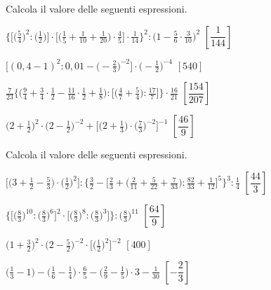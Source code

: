 \begin{esercizio}[\Ast]
\label{ese:3.150}
 Calcola il valore delle seguenti espressioni.
\begin{enumeratea}
\spazielenx
\item \(\displaystyle{\bigg\{\bigg[\bigg(\frac{5}{4}\bigg)^{2}:
\bigg(\frac{1}{2}\bigg)\bigg]\cdot%
\bigg[\bigg(\frac{1}{5}+\frac{1}{10}+\frac{1}{20}\bigg)\cdot\frac{4}{5}\bigg]
\cdot%
\frac{1}{14}\bigg\}^{2}:\bigg(1-\frac{5}{6}\cdot\frac{3}{10}\bigg)^{2}}\)
  \hfill \(\left[\dfrac{1}{144} \right]\)
\item \(\displaystyle{\bigg[(0,4-1)^{2}:0,01-\bigg(-{\frac{2}{3}}\bigg)^{-2}
\bigg]\cdot
\bigg(-{\frac{1}{2}}\bigg)^{-4}}\)
  \hfill \(\left[540 \right]\)
\item \(\displaystyle{\frac{7}{23}\bigg\{\bigg(\frac{9}{4}+\frac{3}{4}\cdot
{\frac{1}{2}}-\frac{11}{16}\cdot\frac{1}{2}+\frac{1}{8}\bigg):\bigg[
\bigg(\frac{4}{7}+\frac{5}{4}\bigg):\frac{17}{7}\bigg]\bigg\}\cdot
{\frac{16}{21}}}\)
  \hfill \(\left[\dfrac{154}{207} \right]\)
\item \(\displaystyle{\bigg(2+\frac{1}{2}\bigg)^{2} \cdot \bigg(2-\frac{1}{2}
\bigg)^{-2}+\bigg[\bigg(2+\frac{1}{3}\bigg)\cdot
\bigg(\frac{7}{3}\bigg)^{-2}\bigg]^{-1}}\)
  \hfill \(\left[\dfrac{46}{9} \right]\)
\end{enumeratea}
\end{esercizio}

\begin{esercizio}[\Ast]
\label{ese:3.151}
 Calcola il valore delle seguenti espressioni.
\begin{enumeratea}
\spazielenx
\item \(\displaystyle{\bigg[\bigg(3+\frac{1}{2}-\frac{5}{3}\bigg)\cdot
\bigg(\frac{1}{2}\bigg)^{2}\bigg]:\bigg\{\frac{3}{2}-\bigg[\frac{2}{3}+
\bigg(\frac{2}{11}+
\frac{5}{22}+\frac{7}{33}\bigg):\frac{82}{33}+\frac{1}{12}\bigg]^{5}
\bigg\}^{3}:\frac{1}{4}}\)
  \hfill \(\left[\dfrac{44}{3} \right]\)
\item \(\displaystyle{\bigg\{\bigg[\bigg(\frac{8}{3}\bigg)^{10}:
\bigg(\frac{8}{3}\bigg)^{6}\bigg]^{2}\cdot
\bigg[\bigg(\frac{8}{3}\bigg)^{8}:\bigg(\frac{8}{3}\bigg)^{3}\bigg]\bigg\}:
\bigg(\frac{8}{3}\bigg)^{11}}\)
  \hfill \(\left[\dfrac{64}{9} \right]\)
\item \(\displaystyle{\bigg(1+\frac{3}{2}\bigg)^{2}\cdot
\bigg(2-\frac{5}{2}\bigg)^{-2}\cdot
\bigg[\bigg(\frac{1}{2}\bigg)^{2}\bigg]^{-2}}\)
  \hfill \(\left[400 \right]\)
\item \(\displaystyle{\bigg(\frac{1}{3}-1\bigg)-\bigg(\frac{1}{6}-
\frac{1}{4}\bigg)\cdot
{\frac{6}{5}}-\bigg(\frac{2}{9}-\frac{1}{5}\bigg)\cdot 3-\frac{1}{30}}\)
  \hfill \(\left[-\dfrac{2}{3} \right]\)
\end{enumeratea}
\end{esercizio}

